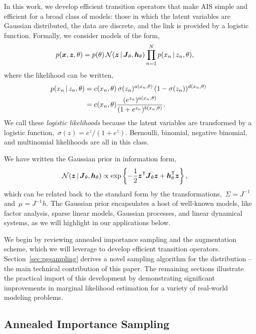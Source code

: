 In this work, we develop efficient transition operators that make AIS
simple and efficient for a broad class of models: those in which the
latent variables are Gaussian distributed, the data are discrete, and
the link is provided by a logistic function. Formally, we consider
models of the form,
\begin{align*}
p(\boldsymbol{x}, \boldsymbol{z}, \theta) 
&= p(\theta) \, \mathcal{N}(\boldsymbol{z} \,|\, \boldsymbol{J}_\theta, \boldsymbol{h}_\theta) \prod_{n=1}^N p(x_n \,|\, z_n, \theta),
\end{align*}
where the likelihood can be written,
\begin{align*}
\nonumber  p(x_n \,|\, z_n, \theta) &= c(x_n, \theta) \, \sigma(z_n)^{a(x_n, \theta)} \, (1-\sigma(z_n))^{d(x_n, \theta)} \\
  &= c(x_n, \theta) \frac{(e^{z_n})^{a(x_n, \theta)}}{(1+e^{z_n})^{b(x_n, \theta)}}.
\end{align*}
We call these \emph{logistic likelihoods} because the latent variables
are transformed by a logistic function,~${\sigma(z)=e^z /(1+e^z)}$.
Bernoulli, binomial, negative binomial, and multinomial likelihoods
are all in this class.

We have written the Gaussian prior in information form,
\begin{align*}
  \mathcal{N}(\boldsymbol{z} \,|\, \boldsymbol{J}_\theta, \boldsymbol{h}_\theta) &\propto \exp \left \{-\frac{1}{2} \boldsymbol{z}^{\mathsf{T}} \boldsymbol{J}_\theta \boldsymbol{z} + \boldsymbol{h}_\theta^{\mathsf{T}} \boldsymbol{z} \right\}, 
\end{align*}
which can be related back to the standard form by the
transformations,~$\Sigma = J^{-1}$ and~$\mu = J^{-1}h$.  The Gaussian
prior encapsulates a host of well-known models, like factor analysis,
sparse linear models, Gaussian processes, and linear dynamical
systems, as we will highlight in our applications below.

We begin by reviewing annealed importance sampling and the \polyagamma
augmentation scheme, which we will leverage to develop efficient
transition operators. Section~\ref{sec:pgsampling} derives a
novel sampling algorithm for the \polyagamma distribution --
the main technical contribution of this paper. The remaining
sections illustrate the practical import of this development
by demonstrating significant improvements in marginal likelihood
estimation for a variety of real-world modeling problems.


\subsection{Annealed Importance Sampling}

